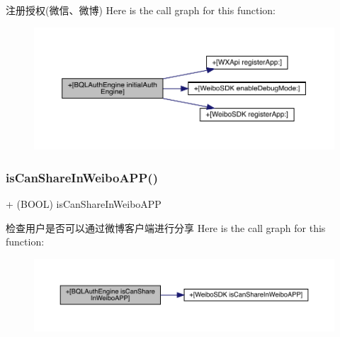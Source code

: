 注册授权(微信、微博) Here is the call graph for this function\+:\nopagebreak
\begin{figure}[H]
\begin{center}
\leavevmode
\includegraphics[width=350pt]{interface_b_q_l_auth_engine_a8723ee35b1aa13e01ad3c7aa515d5834_cgraph}
\end{center}
\end{figure}
\mbox{\label{interface_b_q_l_auth_engine_ab3e8ce480dddadd1f4560775d10b0334}} 
\subsubsection{\texorpdfstring{is\+Can\+Share\+In\+Weibo\+A\+P\+P()}{isCanShareInWeiboAPP()}}
{\footnotesize\ttfamily + (B\+O\+OL) is\+Can\+Share\+In\+Weibo\+A\+PP \begin{DoxyParamCaption}{ }\end{DoxyParamCaption}}

检查用户是否可以通过微博客户端进行分享 Here is the call graph for this function\+:\nopagebreak
\begin{figure}[H]
\begin{center}
\leavevmode
\includegraphics[width=350pt]{interface_b_q_l_auth_engine_ab3e8ce480dddadd1f4560775d10b0334_cgraph}
\end{center}
\end{figure}
\mbox{\label{interface_b_q_l_auth_engine_ad5464cda3e1336c1d315965f74298d03}} 
